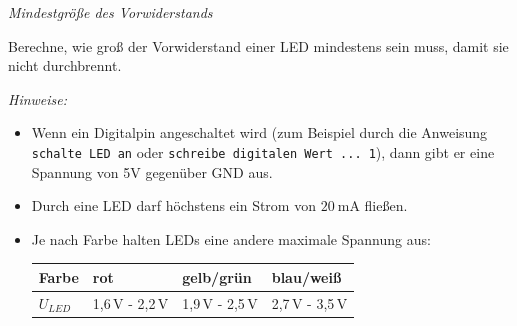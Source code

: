 \begin{aufgabe} \emph{Mindestgröße des Vorwiderstands}
	
	Berechne, wie groß der Vorwiderstand einer LED mindestens sein muss, damit sie nicht durchbrennt.
\end{aufgabe}

\emph{Hinweise:} \vspace{-0.5\baselineskip}
\begin{itemize}[itemsep=0mm,parsep=0mm]
	\item Wenn ein Digitalpin angeschaltet wird (zum Beispiel durch die Anweisung \texttt{schalte LED an} oder \texttt{schreibe digitalen Wert ... 1}), dann gibt er eine Spannung von 5V gegenüber GND aus.
	\item Durch eine LED darf höchstens ein Strom von $\SI{20}{\milli\ampere}$ fließen.
	\item Je nach Farbe halten LEDs eine andere maximale Spannung aus:
	
	\smallskip
	\begin{tabular}{l|l|l|l}
		Farbe & rot & gelb/grün & blau/weiß \\ \hline
		$U_{LED}$ & 1,6\,V - 2,2\,V & 1,9\,V - 2,5\,V & 2,7\,V - 3,5\,V \\
	\end{tabular}
\end{itemize}

